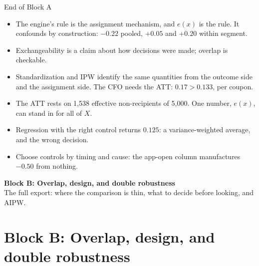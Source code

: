 \documentclass[aspectratio=169, 11pt, handout]{beamer}
\begin{document}
\begin{frame}{End of Block A}

\begin{itemize}
  \item The engine's rule is the assignment mechanism, and $e(x)$ is the rule. It confounds by construction: $-0.22$ pooled, $+0.05$ and $+0.20$ within segment.
  \item Exchangeability is a claim about how decisions were made; overlap is checkable.
  \item Standardization and IPW identify the same quantities from the outcome side and the assignment side. The CFO needs the ATT: $0.17 > 0.133$,  per coupon.
  \item The ATT rests on 1{,}538 effective non-recipients of 5{,}000. One number, $e(x)$, can stand in for all of $X$.
  \item Regression with the right control returns $0.125$: a variance-weighted average, and the wrong decision.
  \item Choose controls by timing and cause: the app-open column manufactures $-0.50$ from nothing.
\end{itemize}

\vfill

\begin{center}
\Large \textbf{Block B: Overlap, design, and double robustness}\\[0.4em]
\normalsize The full export: where the comparison is thin, what to decide before looking, and AIPW.
\end{center}
\vfill
\end{frame}

\section{Block B: Overlap, design, and double robustness}
\end{document}

